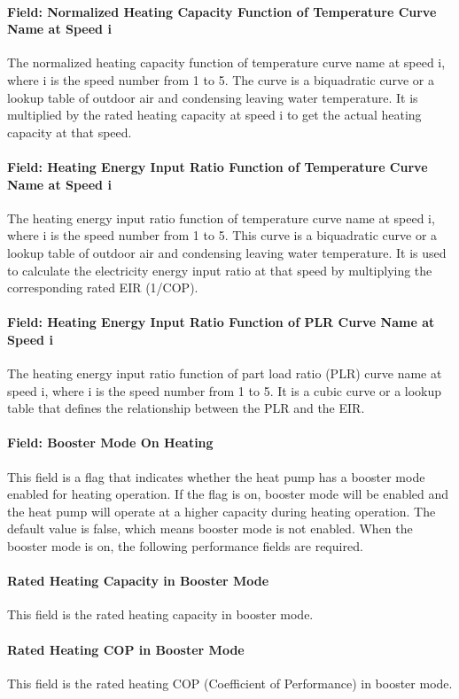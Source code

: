\paragraph{Field: Normalized Heating Capacity Function of Temperature Curve Name
at Speed i} The normalized heating capacity function of temperature curve name
at speed i, where i is the speed number from 1 to 5. The curve is a biquadratic
curve or a lookup table of outdoor air and condensing leaving water temperature.
It is multiplied by the rated heating capacity at speed i to get the actual
heating capacity at that speed.
\paragraph{Field: Heating Energy Input Ratio Function of Temperature Curve Name
at Speed i} The heating energy input ratio function of temperature curve name at
speed i, where i is the speed number from 1 to 5. This curve is a biquadratic
curve or a lookup table of outdoor air and condensing leaving water temperature.
It is used to calculate the electricity energy input ratio at that speed by
multiplying the corresponding rated EIR (1/COP).
\paragraph{Field: Heating Energy Input Ratio Function of PLR Curve Name at Speed
i} The heating energy input ratio function of part load ratio (PLR) curve name
at speed i, where i is the speed number from 1 to 5. It is a cubic curve or a
lookup table that defines the relationship between the PLR and the EIR.
\paragraph{Field: Booster Mode On Heating} This field is a flag that indicates
whether the heat pump has a booster mode enabled for heating operation. If the
flag is on, booster mode will be enabled and the heat pump will operate at a
higher capacity during heating operation. The default value is false, which
means booster mode is not enabled. When the booster mode is on, the following
performance fields are required.
\paragraph{Rated Heating Capacity in Booster Mode} This field is the rated
heating capacity in booster mode.
\paragraph{Rated Heating COP in Booster Mode} This field is the rated heating
COP (Coefficient of Performance) in booster mode.
